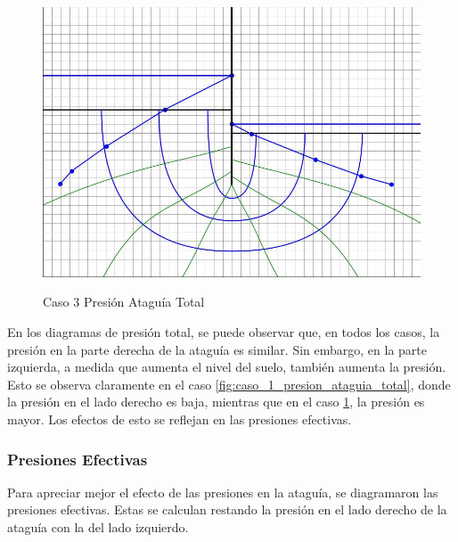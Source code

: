 \begin{figure}[H]
    \begin{minipage}{0.32\textwidth}
        \centering
        \includegraphics[width=\textwidth]{GRAFICOS/caso_3_presion_ataguia_total.jpg}
        \caption{Caso 3 Presión Ataguía Total}
        \label{fig:caso_3_presion_ataguia_total}
    \end{minipage}
\end{figure}

En los diagramas de presión total, se puede observar que, en todos los casos, la presión en la parte derecha de la ataguía es similar. Sin embargo, en la parte izquierda, a medida que aumenta el nivel del suelo, también aumenta la presión. Esto se observa claramente en el caso \ref{fig:caso_1_presion_ataguia_total}, donde la presión en el lado derecho es baja, mientras que en el caso \ref{fig:caso_3_presion_ataguia_total}, la presión es mayor. Los efectos de esto se reflejan en las presiones efectivas.

\subsubsection{Presiones Efectivas}

Para apreciar mejor el efecto de las presiones en la ataguía, se diagramaron las presiones efectivas. Estas se calculan restando la presión en el lado derecho de la ataguía con la del lado izquierdo.

